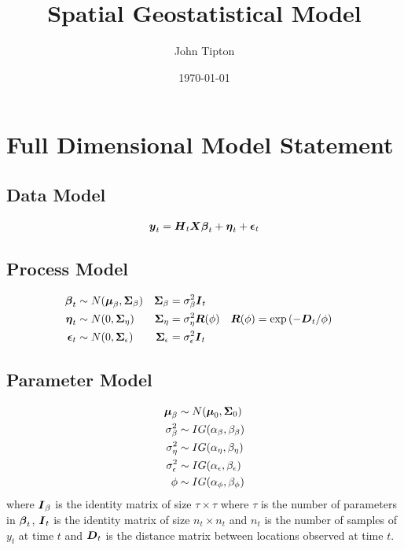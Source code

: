 \documentclass[fleqn]{article}
\title{Spatial Geostatistical Model}
\author{John Tipton}
\date{\today}
\def\bm#1{\mbox{\boldmath $#1$}}
\begin{document}
\maketitle

\section{Full Dimensional Model Statement}
%
\subsection{Data Model}
\begin{align*}
\bm{y}_t & = \bm{H}_t \bm{X} \bm{\beta}_t + \bm{\eta}_t + \bm{\epsilon}_t\\
%
\end{align*}
%
\subsection{Process Model}
%
\begin{align*}
%
\bm{\beta}_t & \sim N(\bm{\mu}_\beta, \bm{\Sigma}_\beta) & \bm{\Sigma}_\beta &  = \sigma^2_\beta \bm{I}_t\\
%
\bm{\eta}_t & \sim N(0, \bm{\Sigma}_\eta) & \bm{\Sigma}_\eta &  = \sigma^2_\eta \bm{R}(\phi) & \bm{R}(\phi) & = \exp{( - \bm{D}_t / \phi)}\\
%
\bm{\epsilon}_t & \sim N(0, \bm{\Sigma}_\epsilon) & \bm{\Sigma}_\epsilon &  = \sigma^2_\epsilon \bm{I}_t\\
%
\end{align*}
%
\subsection{Parameter Model}
%
\begin{align*}
%
\bm{\mu}_\beta & \sim N(\bm{\mu}_0, \bm{\Sigma}_0)\\
%
\sigma^2_\beta & \sim IG(\alpha_\beta, \beta_\beta)\\
%
\sigma^2_\eta & \sim IG(\alpha_\eta, \beta_\eta)\\
%
\sigma^2_\epsilon & \sim IG(\alpha_\epsilon, \beta_\epsilon)\\
%
\phi & \sim IG(\alpha_\phi, \beta_\phi)
\end{align*}
%
where $\bm{I}_\beta$ is the identity matrix of size $\tau \times \tau$ where $\tau$ is the number of parameters in $\bm{\beta}_t$, $\bm{I}_t$ is the identity matrix of size $n_t \times n_t$ and $n_t$ is the number of samples of $y_t$ at time $t$ and $\bm{D}_t$ is the distance matrix between locations observed at time $t$.
%
\end{document}
